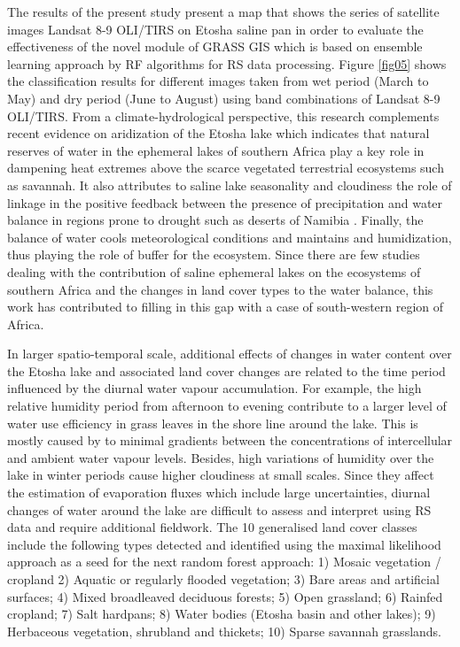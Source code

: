 \documentclass[climate,article,submit,pdftex,moreauthors]{Definitions/mdpi}
\begin{document}
The results of the present study present a map that shows the series of satellite images Landsat 8-9 OLI/TIRS on Etosha saline pan in order to evaluate the effectiveness of the novel module of GRASS GIS which is based on ensemble learning approach by RF algorithms for RS data processing. Figure \ref{fig05} shows the classification results for different images taken from wet period (March to May) and dry period (June to August) using band combinations of Landsat 8-9 OLI/TIRS. {From a climate-hydrological perspective, this research complements recent evidence on aridization of the Etosha lake which indicates that natural reserves of water in the ephemeral lakes of southern Africa play a key role in dampening heat extremes above the scarce vegetated terrestrial ecosystems such as savannah. It also attributes to saline lake seasonality and cloudiness the role of linkage in the positive feedback between the presence of precipitation and water balance in regions prone to drought such as deserts of Namibia} \cite{MORETTI202235588,WENBORN2025105309}. {Finally, the balance of water cools meteorological conditions and maintains and humidization, thus playing the role of buffer for the ecosystem. Since there are few studies dealing with the contribution of saline ephemeral lakes on the ecosystems of southern Africa and the changes in land cover types to the water balance, this work has contributed to filling in this gap with a case of south-western region of Africa.}

 {In larger spatio-temporal scale, additional effects of changes in water content over the Etosha lake and associated land cover changes are related to the time period influenced by the diurnal water vapour accumulation. For example, the high relative humidity period from afternoon to evening contribute to a larger level of water use efficiency in grass leaves in the shore line around the lake. This is mostly caused by to minimal gradients between the concentrations of intercellular and ambient water vapour levels. Besides, high variations of humidity over the lake in winter periods cause higher cloudiness at small scales. Since they affect the estimation of evaporation fluxes which include large uncertainties, diurnal changes of water around the lake are difficult to assess and interpret using RS data and require additional fieldwork.} The 10 generalised land cover classes include the following types detected and identified using the maximal likelihood approach as a seed for the next random forest approach: 1) Mosaic vegetation / cropland 2) Aquatic or regularly flooded vegetation; 3) Bare areas and artificial surfaces; 4) Mixed broadleaved deciduous forests; 5) Open grassland; 6) Rainfed cropland; 7) Salt hardpans; 8) Water bodies (Etosha basin and other lakes); 9) Herbaceous vegetation, shrubland and thickets; 10) Sparse savannah grasslands.
\end{document}
